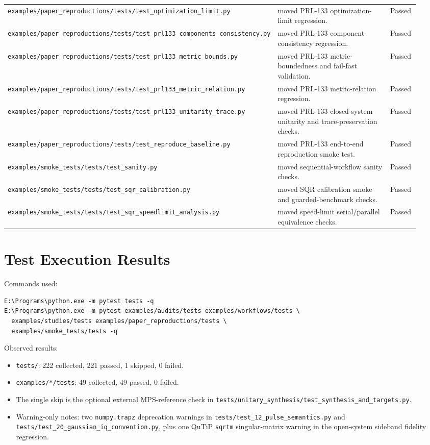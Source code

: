 \documentclass[11pt]{article}
\begin{document}
\begin{longtable}{p{0.30\linewidth} p{0.56\linewidth} p{0.08\linewidth}}
\texttt{examples/paper\_reproductions/tests/test\_optimization\_limit.py} & moved PRL-133 optimization-limit regression. & Passed \\
\texttt{examples/paper\_reproductions/tests/test\_prl133\_components\_consistency.py} & moved PRL-133 component-consistency regression. & Passed \\
\texttt{examples/paper\_reproductions/tests/test\_prl133\_metric\_bounds.py} & moved PRL-133 metric-boundedness and fail-fast validation. & Passed \\
\texttt{examples/paper\_reproductions/tests/test\_prl133\_metric\_relation.py} & moved PRL-133 metric-relation regression. & Passed \\
\texttt{examples/paper\_reproductions/tests/test\_prl133\_unitarity\_trace.py} & moved PRL-133 closed-system unitarity and trace-preservation checks. & Passed \\
\texttt{examples/paper\_reproductions/tests/test\_reproduce\_baseline.py} & moved PRL-133 end-to-end reproduction smoke test. & Passed \\
\texttt{examples/smoke\_tests/tests/test\_sanity.py} & moved sequential-workflow sanity checks. & Passed \\
\texttt{examples/smoke\_tests/tests/test\_sqr\_calibration.py} & moved SQR calibration smoke and guarded-benchmark checks. & Passed \\
\texttt{examples/smoke\_tests/tests/test\_sqr\_speedlimit\_analysis.py} & moved speed-limit serial/parallel equivalence checks. & Passed \\
\bottomrule
\end{longtable}
\normalsize

\section{Test Execution Results}
Commands used:
\begin{verbatim}
E:\Programs\python.exe -m pytest tests -q
E:\Programs\python.exe -m pytest examples/audits/tests examples/workflows/tests \
  examples/studies/tests examples/paper_reproductions/tests \
  examples/smoke_tests/tests -q
\end{verbatim}

\noindent
Observed results:
\begin{itemize}[leftmargin=1.5em]
  \item \texttt{tests/}: 222 collected, 221 passed, 1 skipped, 0 failed.
  \item \texttt{examples/*/tests}: 49 collected, 49 passed, 0 failed.
  \item The single skip is the optional external MPS-reference check in
  \texttt{tests/unitary\_synthesis/test\_synthesis\_and\_targets.py}.
  \item Warning-only notes: two \texttt{numpy.trapz} deprecation warnings in
  \texttt{tests/test\_12\_pulse\_semantics.py} and
  \texttt{tests/test\_20\_gaussian\_iq\_convention.py}, plus one QuTiP
  \texttt{sqrtm} singular-matrix warning in the open-system sideband fidelity regression.
\end{itemize}
\end{document}
